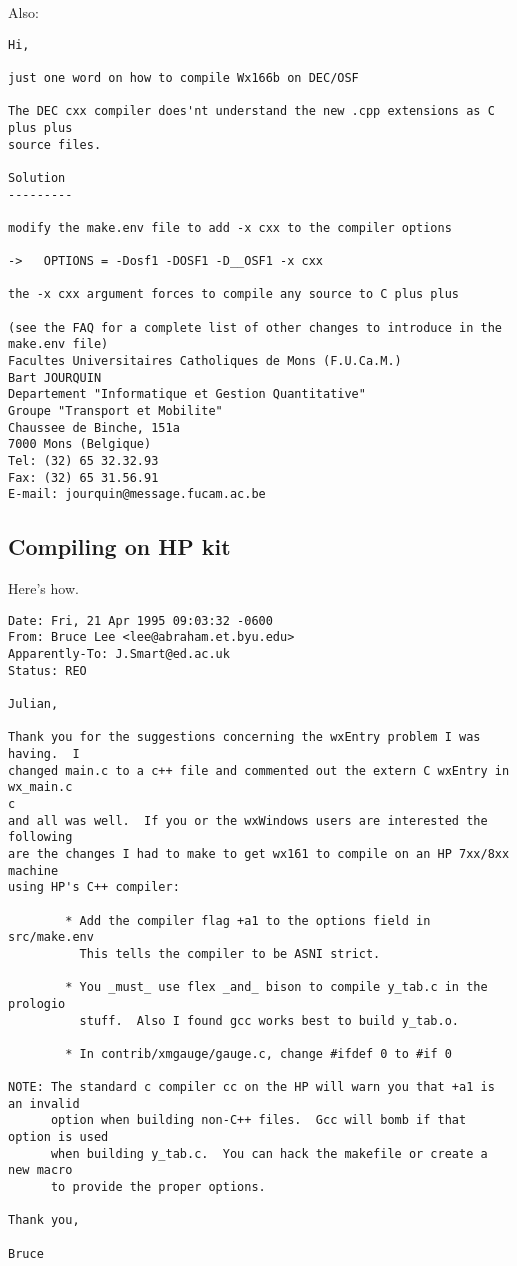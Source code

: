 Also:

\begin{verbatim}
Hi,

just one word on how to compile Wx166b on DEC/OSF

The DEC cxx compiler does'nt understand the new .cpp extensions as C plus plus
source files.

Solution
---------

modify the make.env file to add -x cxx to the compiler options

->   OPTIONS = -Dosf1 -DOSF1 -D__OSF1 -x cxx

the -x cxx argument forces to compile any source to C plus plus

(see the FAQ for a complete list of other changes to introduce in the
make.env file)
Facultes Universitaires Catholiques de Mons (F.U.Ca.M.)
Bart JOURQUIN
Departement "Informatique et Gestion Quantitative"
Groupe "Transport et Mobilite"
Chaussee de Binche, 151a
7000 Mons (Belgique)
Tel: (32) 65 32.32.93
Fax: (32) 65 31.56.91
E-mail: jourquin@message.fucam.ac.be
\end{verbatim}

\subsection{Compiling on HP kit}

Here's how.

\begin{verbatim}
Date: Fri, 21 Apr 1995 09:03:32 -0600
From: Bruce Lee <lee@abraham.et.byu.edu>
Apparently-To: J.Smart@ed.ac.uk
Status: REO

Julian,

Thank you for the suggestions concerning the wxEntry problem I was having.  I
changed main.c to a c++ file and commented out the extern C wxEntry in wx_main.c
c
and all was well.  If you or the wxWindows users are interested the following
are the changes I had to make to get wx161 to compile on an HP 7xx/8xx machine
using HP's C++ compiler:

        * Add the compiler flag +a1 to the options field in src/make.env
          This tells the compiler to be ASNI strict.

        * You _must_ use flex _and_ bison to compile y_tab.c in the prologio
          stuff.  Also I found gcc works best to build y_tab.o.

        * In contrib/xmgauge/gauge.c, change #ifdef 0 to #if 0

NOTE: The standard c compiler cc on the HP will warn you that +a1 is an invalid
      option when building non-C++ files.  Gcc will bomb if that option is used
      when building y_tab.c.  You can hack the makefile or create a new macro
      to provide the proper options.

Thank you,

Bruce
\end{verbatim}


